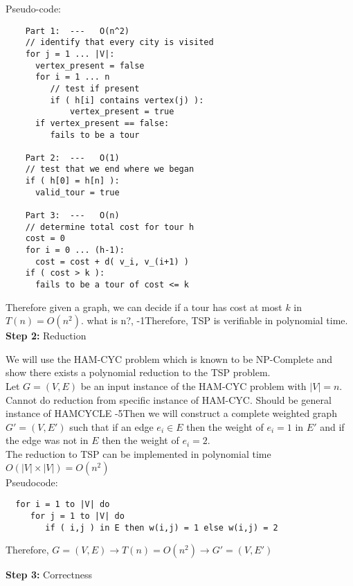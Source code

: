 \documentclass{article}
\newcommand{\add}[1]{\textcolor{dkgreen}{#1}}
\begin{document}
    Pseudo-code: \\
    \begin{verbatim}
    Part 1:  ---   O(n^2)
    // identify that every city is visited
    for j = 1 ... |V|:
      vertex_present = false
      for i = 1 ... n
         // test if present
         if ( h[i] contains vertex(j) ):
             vertex_present = true
      if vertex_present == false:
         fails to be a tour

    Part 2:  ---   O(1)
    // test that we end where we began
    if ( h[0] = h[n] ):
      valid_tour = true

    Part 3:  ---   O(n)
    // determine total cost for tour h
    cost = 0
    for i = 0 ... (h-1):
      cost = cost + d( v_i, v_(i+1) )
    if ( cost > k ):
      fails to be a tour of cost <= k
    \end{verbatim}      
    
     Therefore given a graph, we can decide if a tour has cost at most
     $k$ in $T(n) = O(n^2)$. \add{what is n?, -1}Therefore, TSP is verifiable in polynomial time. \\

  {\bf Step 2:} Reduction

  We will use the HAM-CYC problem which is known to be NP-Complete
  and show there exists a polynomial reduction to the TSP problem. \\
  
  Let $G = (V,E)$ be an input instance of the HAM-CYC problem with
  $|V|=n$. \add{Cannot do reduction from specific instance of HAM-CYC.  Should be general instance of HAMCYCLE -5}Then we will construct a complete weighted graph $G' = (V, E')$ such
  that if an edge $e_i \in E$ then the weight of $e_i = 1$ in $E'$
  and if the edge was not in $E$ then the weight of $e_i = 2$. \\
  
  The reduction to TSP can be implemented in polynomial time
  $O(|V| \times |V|) = O(n^2)$ \\
  
  Pseudocode:
  
  \begin{verbatim}
  for i = 1 to |V| do
     for j = 1 to |V| do
        if ( i,j ) in E then w(i,j) = 1 else w(i,j) = 2
  \end{verbatim}
  
  Therefore, $G = (V, E) \rightarrow T(n) = O(n^2) \rightarrow G' = (V, E')$

  

  {\bf Step 3:} Correctness
\end{document}
